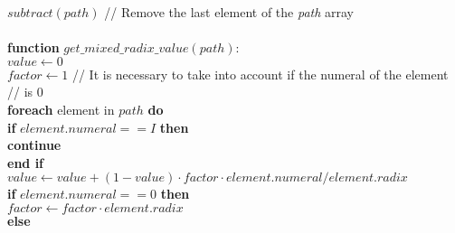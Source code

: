\begin{algorithm}
\begin{algorithmic}
\hspace{0.3cm} $subtract(path)$ \hspace{0.5cm} \slash\slash \hspace{0.1cm} Remove the last element of the \textit{path} array\\

\\

\textbf{function} $get\_mixed\_radix\_value(path)$:\\

\hspace{0.3cm} $value \gets 0$\\

\hspace{0.3cm} $factor \gets 1$ \hspace{0.5cm} \slash\slash \hspace{0.1cm} It is necessary to take into account if the numeral of the element\\
\hspace{3.05cm} \slash\slash \hspace{0.1cm} is 0\\

\hspace{0.3cm} \textbf{foreach} element in $path$ \textbf{do}\\

\hspace{0.6cm} \textbf{if} $element.numeral == I$ \textbf{then}\\

\hspace{0.9cm} \textbf{continue}\\

\hspace{0.6cm} \textbf{end if}\\

\hspace{0.6cm} $value \gets value + (1 - value) \cdot factor \cdot element.numeral / element.radix $\\

\hspace{0.6cm} \textbf{if} $element.numeral == 0$ \textbf{then}\\

\hspace{0.9cm} $factor \gets factor \cdot element.radix$\\

\hspace{0.6cm} \textbf{else}\\


\end{algorithmic}
\end{algorithm}
